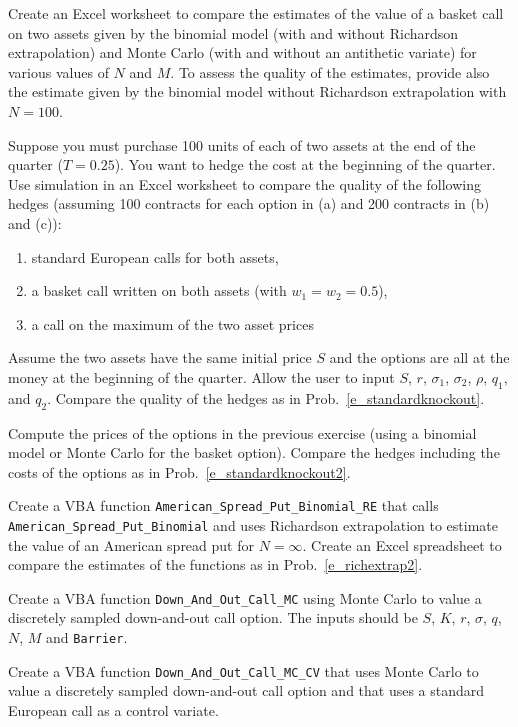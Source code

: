 \begin{prob}\label{e_richextrap2}
Create an Excel worksheet to compare the estimates of the value of a basket call on two assets given by the binomial model (with and without Richardson extrapolation) and Monte Carlo (with and without an antithetic variate) for various values of $N$ and $M$.  To assess the quality of the estimates, provide also the estimate given by the binomial model without Richardson extrapolation with $N=100$.  \end{prob}
\begin{prob} Suppose you must purchase 100 units of each of two assets at the end of the quarter ($T=0.25$).  You want to hedge the cost at the beginning of the quarter.  Use simulation in an Excel worksheet to compare the quality of the following hedges (assuming 100 contracts for each option in (a) and 200 contracts in (b) and (c)):
\begin{enumerate}
\renewcommand{\labelenumi}{(\alph{enumi})}
\item standard European calls for both assets,
\item a basket call written on both assets (with $w_1 = w_2 = 0.5$),
\item a call on the maximum of the two asset prices
\end{enumerate}
Assume the two assets have the same initial price $S$ and the options are all at the money at the beginning of the quarter.  Allow the user to input $S$, $r$, $\sigma_1$, $\sigma_2$, $\rho$, $q_1$, and $q_2$.  Compare the quality of the hedges as in Prob.~\ref{e_standardknockout}.
\end{prob}
\begin{prob} Compute the prices of the options in the previous exercise (using a binomial model or Monte Carlo for the basket option).  Compare the hedges including the costs of the options as in Prob.~\ref{e_standardknockout2}. \end{prob}
\begin{prob} Create a VBA function \verb!American_Spread_Put_Binomial_RE! that calls \verb!American_Spread_Put_Binomial! and uses Richardson extrapolation to estimate the value of an American spread put for $N=\infty$.  Create an Excel spreadsheet to compare the estimates of the functions as in Prob.~\ref{e_richextrap2}.
\end{prob}
\begin{prob} Create a VBA function \verb!Down_And_Out_Call_MC! using Monte Carlo to value a discretely sampled down-and-out call option.  The inputs should be $S$, $K$, $r$, $\sigma$, $q$, $N$, $M$ and \verb!Barrier!. \label{e_knockoutmc}
\end{prob}
\begin{prob}
Create a VBA function \verb!Down_And_Out_Call_MC_CV! that uses Monte Carlo to value a discretely sampled down-and-out call option and that uses  a standard European call as a control variate.
\end{prob}



